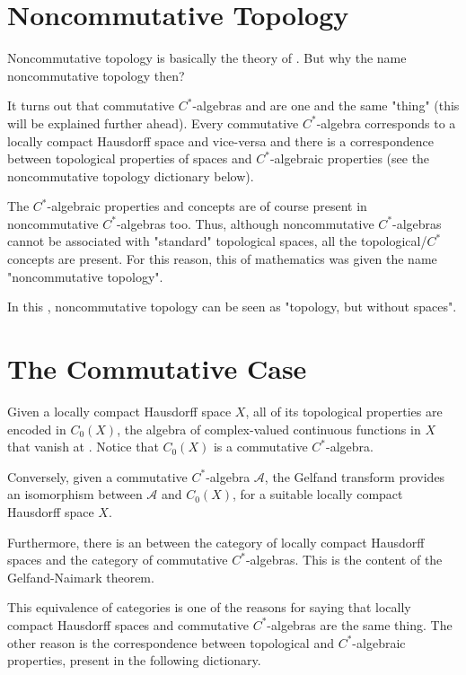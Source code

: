 \documentclass[12pt]{article}
\begin{document}

\section{Noncommutative Topology}
Noncommutative topology is basically the theory of . But why the name noncommutative topology then?

It turns out that commutative $C^*$-algebras and 
 are one and the same "thing" (this will be explained further ahead). Every commutative $C^*$-algebra corresponds to a locally compact Hausdorff space and vice-versa and there is a correspondence between topological properties of spaces and $C^*$-algebraic properties (see the noncommutative topology dictionary below).

The $C^*$-algebraic properties and concepts are of course present in noncommutative $C^*$-algebras too. Thus, although noncommutative $C^*$-algebras cannot be associated with "standard" topological spaces, all the topological/$C^*$ concepts are present. For this reason, this  of mathematics was given the name "noncommutative topology".

In this , noncommutative topology can be seen as "topology, but without spaces".

\section{The Commutative Case}
Given a locally compact Hausdorff space $X$, all of its topological properties are encoded in $C_0(X)$, the algebra of complex-valued continuous functions in $X$ that vanish at . Notice that $C_0(X)$ is a commutative $C^*$-algebra.

Conversely, given a commutative $C^*$-algebra $\mathcal{A}$, the Gelfand transform provides an isomorphism between $\mathcal{A}$ and $C_0(X)$, for a suitable locally compact Hausdorff space $X$.

Furthermore, there is an  between the category of locally compact Hausdorff spaces and the category of commutative $C^*$-algebras. This is the content of the Gelfand-Naimark theorem.

This equivalence of categories is one of the reasons for saying that locally compact Hausdorff spaces and commutative $C^*$-algebras are the same thing. The other reason is the correspondence between topological and $C^*$-algebraic properties, present in the following dictionary.
\end{document}
